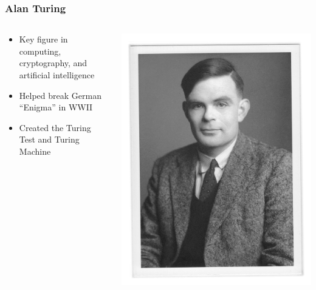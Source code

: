 \documentclass{beamer}
\begin{document}
\begin{frame}
    \frametitle{Alan Turing}
    \begin{columns}
        \begin{column}{0.6\linewidth}
            \begin{itemize}
                \item<1-> Key figure in computing, cryptography, and artificial intelligence
                \item<2-> Helped break German ``Enigma'' in WWII
                \item<3-> Created the Turing Test and Turing Machine
            \end{itemize}
        \end{column}
        \begin{column}{0.4\linewidth}
            \centering
            \includegraphics[width=\linewidth]{Alan_Turing.jpg}
        \end{column}
    \end{columns} 
\end{frame}
\end{document}
